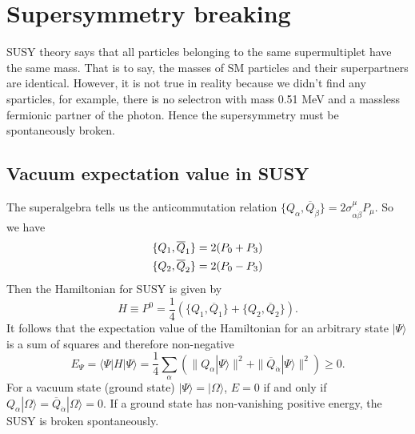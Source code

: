 \documentclass[12pt]{report}
\begin{document}
\chapter{Supersymmetry breaking}

SUSY theory says that all particles belonging to the same supermultiplet have the same mass.
That is to say, the masses of SM particles and their superpartners are identical.
However, it is not true in reality because we didn't find any sparticles, for example, there is no selectron with mass 0.51 MeV and a massless fermionic partner of the photon.
Hence the supersymmetry must be spontaneously broken.



\section{Vacuum expectation value in SUSY}
The superalgebra tells us the anticommutation relation $\{ Q_{\alpha}, \overline{Q}_{\dot{\beta}} \} = 2 \sigma^{\mu}_{\alpha \dot{\beta}} P_{\mu}$.
So we have
\begin{align}
\{ Q_{1}, \overline{Q}_{1} \} = 2 ( P_{0} + P_{3}) \notag \\
\{ Q_{2}, \overline{Q}_{2} \} = 2 ( P_{0} - P_{3}) 
\end{align}
Then the Hamiltonian for SUSY is given by
\begin{equation}
H \equiv P^{0} = \frac{1}{4} (\{ Q_{1}, \overline{Q}_{1} \}  + \{ Q_{2}, \overline{Q}_{2} \} ) .
\end{equation}
It follows that the expectation value of the Hamiltonian for an arbitrary state $| \Psi \rangle$ is a sum of squares and therefore non-negative
\begin{equation}
E_{\Psi} = \langle \Psi | H | \Psi \rangle = \frac{1}{4} \sum_{\alpha} ( \| Q_{\alpha} | \Psi \rangle \|^2 + \| \overline{Q}_{\dot{\alpha}} | \Psi \rangle \|^2 ) \ge 0 .
\end{equation}
For a vacuum state (ground state) $|\Psi \rangle = | \Omega \rangle$, $E = 0$ if and only if $Q_{\alpha} | \Omega \rangle = \overline{Q}_{\dot{\alpha}} | \Omega \rangle = 0$.
If a ground state has non-vanishing positive energy, the SUSY is broken spontaneously. 
\end{document}
